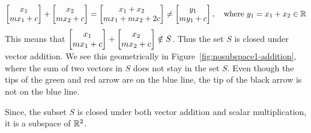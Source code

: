 \begin{boxedstuff}
\begin{example}
\begin{enumerate}
        \[ \bmxc x_1 \\ m x_1 + c\emx + \bmxc x_2 \\ m x_2 + c\emx = \bmxc x_1 + x_2 \\ m x_1 + m x_2 + 2c \emx \neq \bmxc y_1 \\ m y_1 + c\emx, \quad \text{where} \,\, y_1 = x_1 + x_2 \in \mb{R} \]
        This means that $\bmxc x_1 \\ m x_1 + c\emx + \bmxc x_2 \\ m x_2 + c\emx \notin S$. Thus the set $S$ is closed under vector addition. We see this geometrically in Figure~\ref{fig:nosubspace1-addition}, where the sum of two vectors in $S$ does not stay in the set $S$. Even though the tips of the green and red arrow are on the blue line, the tip of the black arrow is not on the blue line.
    \end{enumerate}
    Since, the subset $S$ is closed under both vector addition and scalar multiplication, it is a subspace of $\mathbb{R}^2$.
    \label{example:nosubspace-straight-line}
\end{example}
\end{boxedstuff}
